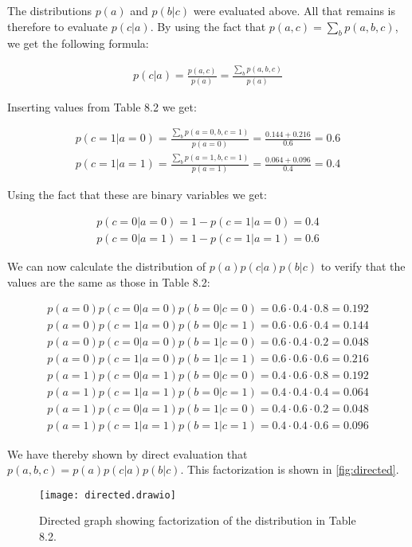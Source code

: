 \documentclass[a4paper, 12pt]{article}
\begin{document}
The distributions $p(a)$ and $p(b|c)$ were evaluated above. All that remains is therefore to evaluate $p(c|a)$. By using the fact that $p(a,c) = \sum_b p(a,b,c)$, we get the following formula:

\begin{align}
	p(c|a) = \frac{p(a,c)}{p(a)} = \frac{\sum_b p(a,b,c)}{p(a)}
\end{align}

Inserting values from Table 8.2 we get:

\begin{align}
	p(c=1|a=0) = \frac{\sum_b p(a=0,b,c=1)}{p(a=0)} = \frac{0.144 + 0.216}{0.6} = 0.6\\
	p(c=1|a=1) = \frac{\sum_b p(a=1,b,c=1)}{p(a=1)} = \frac{0.064 + 0.096}{0.4} = 0.4
\end{align}

Using the fact that these are binary variables we get:

\begin{align}
	p(c=0|a=0) = 1 - p(c=1|a=0) = 0.4\\
	p(c=0|a=1) = 1 - p(c=1|a=1) = 0.6
\end{align}

We can now calculate the distribution of $p(a)p(c|a)p(b|c)$ to verify that the values are the same as those in Table 8.2:

\begin{align}
	p(a=0)p(c=0|a=0)p(b=0|c=0) = 0.6 \cdot 0.4 \cdot 0.8 = 0.192\\
	p(a=0)p(c=1|a=0)p(b=0|c=1) = 0.6 \cdot 0.6 \cdot 0.4 = 0.144\\
	p(a=0)p(c=0|a=0)p(b=1|c=0) = 0.6 \cdot 0.4 \cdot 0.2 = 0.048\\
	p(a=0)p(c=1|a=0)p(b=1|c=1) = 0.6 \cdot 0.6 \cdot 0.6 = 0.216\\
	p(a=1)p(c=0|a=1)p(b=0|c=0) = 0.4 \cdot 0.6 \cdot 0.8 = 0.192\\
	p(a=1)p(c=1|a=1)p(b=0|c=1) = 0.4 \cdot 0.4 \cdot 0.4 = 0.064\\
	p(a=1)p(c=0|a=1)p(b=1|c=0) = 0.4 \cdot 0.6 \cdot 0.2 = 0.048\\
	p(a=1)p(c=1|a=1)p(b=1|c=1) = 0.4 \cdot 0.4 \cdot 0.6 = 0.096
\end{align}

We have thereby shown by direct evaluation that $p(a,b,c) = p(a)p(c|a)p(b|c)$. This factorization is shown in \autoref{fig:directed}.

\begin{figure}[h]
	\centering
	\texttt{[image: directed.drawio]}
	\caption{Directed graph showing factorization of the distribution in Table 8.2.}
	\label{fig:directed}
\end{figure}
\end{document}

